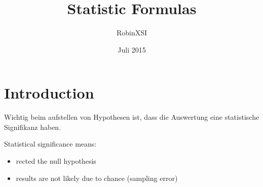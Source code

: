 \documentclass[landscape]{article}
\title{Statistic Formulas}
\author{RobinXSI}
\date{Juli 2015}
\begin{document}
   \maketitle
   	\section{Introduction}

   		Wichtig beim aufstellen von Hypothesen ist, dass die Auswertung eine statistische Signifikanz haben.

   		Statistical significance means:
		\begin{itemize}
			\item rected the null hypothesis
			\item results are not likely due to chance (sampling error)
		\end{itemize}
\end{document}

